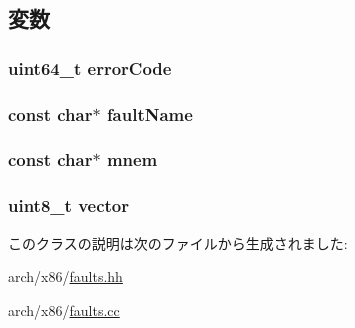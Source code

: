 \subsection{変数}
\hypertarget{classX86ISA_1_1X86FaultBase_a0569d3106ee8c4c5e61fcbf93f13379d}{
\subsubsection[{errorCode}]{\setlength{\rightskip}{0pt plus 5cm}uint64\_\-t {\bf errorCode}}}
\label{classX86ISA_1_1X86FaultBase_a0569d3106ee8c4c5e61fcbf93f13379d}
\hypertarget{classX86ISA_1_1X86FaultBase_ae22cddc5ef9722fc965147e9eba686a1}{
\subsubsection[{faultName}]{\setlength{\rightskip}{0pt plus 5cm}const char$\ast$ {\bf faultName}}}
\label{classX86ISA_1_1X86FaultBase_ae22cddc5ef9722fc965147e9eba686a1}
\hypertarget{classX86ISA_1_1X86FaultBase_a7bb17f43dadf35d103ef6a25b64c4e9f}{
\subsubsection[{mnem}]{\setlength{\rightskip}{0pt plus 5cm}const char$\ast$ {\bf mnem}}}
\label{classX86ISA_1_1X86FaultBase_a7bb17f43dadf35d103ef6a25b64c4e9f}
\hypertarget{classX86ISA_1_1X86FaultBase_ae369101f45bd256ca2745204afe38a47}{
\subsubsection[{vector}]{\setlength{\rightskip}{0pt plus 5cm}uint8\_\-t {\bf vector}}}
\label{classX86ISA_1_1X86FaultBase_ae369101f45bd256ca2745204afe38a47}


このクラスの説明は次のファイルから生成されました:\begin{DoxyCompactItemize}
\item 
arch/x86/\hyperlink{arch_2x86_2faults_8hh}{faults.hh}\item 
arch/x86/\hyperlink{arch_2x86_2faults_8cc}{faults.cc}\end{DoxyCompactItemize}
